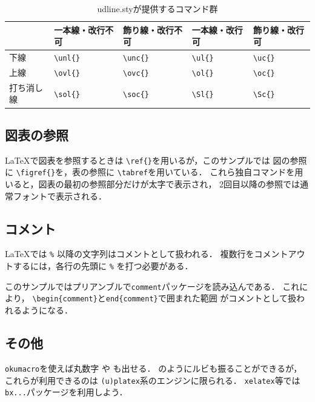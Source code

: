 \documentclass[uplatex]{jsarticle}
\begin{document}
\begin{table}[h]
  \centering
  \small
  \caption{udline.styが提供するコマンド群}
  \label{tab:udline}
  \begin{tabular}[h]{l|p{}|p{}|p{}|p{}}
    \hline
    \hline
     & 一本線・改行不可 & 飾り線・改行不可 & 一本線・改行可 & 飾り線・改行可\\
    \hline
    下線 & \verb|\unl{}| & \verb|\unc{}| & \verb|\ul{}| & \verb|\uc{}|\\
    上線 & \verb|\ovl{}| & \verb|\ovc{}| & \verb|\ol{}| & \verb|\oc{}|\\
    打ち消し線 & \verb|\sol{}| & \verb|\soc{}| & \verb|\Sl{}| & \verb|\Sc{}|\\
    \hline
  \end{tabular}
\end{table}

\subsection{図表の参照}

\LaTeX で図表を参照するときは \verb|\ref{}|を用いるが，このサンプルでは
図の参照に \verb|\figref{}|を，表の参照に \verb|\tabref|を用いている．
これら独自コマンドを用いると，図表の最初の参照部分だけが太字で表示され，
2回目以降の参照では通常フォントで表示される．

\subsection{コメント}

\LaTeX では \verb|%| 以降の文字列はコメントとして扱われる\cite{翔悟17}．
複数行をコメントアウトするには，各行の先頭に \verb|%| を打つ必要がある．

このサンプルではプリアンブルで\verb|comment|パッケージを読み込んである．
これにより， \verb|\begin{comment}|と\verb|end{comment}|で囲まれた範囲
がコメントとして扱われるようになる．

\subsection{その他}

\texttt{okumacro}を使えば丸数字  や \return も出せる．
のようにルビも振ることができるが，これらが利用できるのは
\texttt{(u)platex}系のエンジンに限られる．
\texttt{xelatex}等では\texttt{bx...}パッケージを利用しよう．

\end{document}
